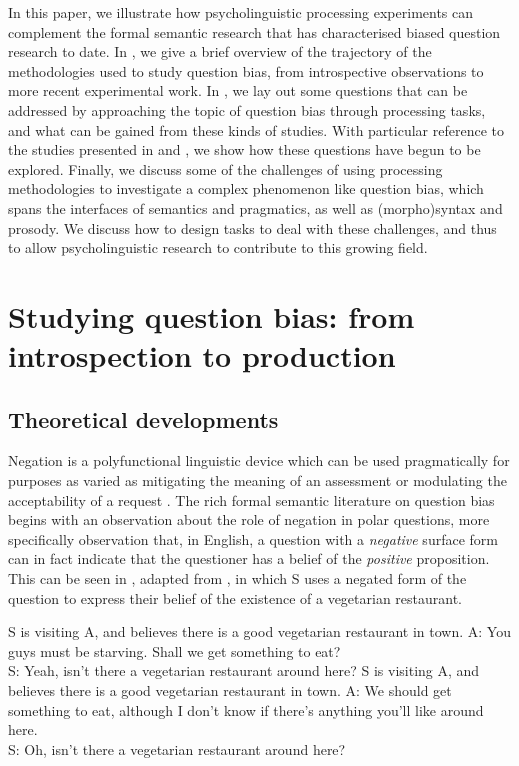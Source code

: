 \documentclass[output=paper,colorlinks,citecolor=brown]{langscibook}
\begin{document}
In this paper, we illustrate how psycholinguistic processing experiments can complement the formal semantic research that has characterised biased question research to date. In , we give a brief overview of the trajectory of the methodologies used to study question bias, from introspective observations to more recent experimental work. In , we lay out some questions that can be addressed by approaching the topic of question bias through processing tasks, and what can be gained from these kinds of studies. With particular reference to the studies presented in \citet{macuch_processing_inprep} and \citet{tian_representing_2021}, we show how these questions have begun to be explored. Finally, we discuss some of the challenges of using processing methodologies to investigate a complex phenomenon like question bias, which spans the interfaces of semantics and pragmatics, as well as (morpho)syntax and prosody. We discuss how to design tasks to deal with these challenges, and thus to allow psycholinguistic research to contribute to this growing field.

\section{Studying question bias: from introspection to production} \label{sec2}

\subsection{Theoretical developments}\label{sec2.1}

Negation is a polyfunctional linguistic device which can be used pragmatically for purposes as varied as mitigating the meaning of an assessment \citep[e.g.][]{fraenkel2008meaning, giora2005negation, krifka2007negated} or modulating the acceptability of a request \citep[e.g.][]{koike1994negation}. The rich formal semantic literature on question bias begins with an observation about the role of negation in polar questions, more specifically  observation that, in English, a question with a \textit{negative} surface form can in fact indicate that the questioner has a belief of the \textit{positive} proposition. This can be seen in , adapted from \citet{ladd_first_1981}, in which S uses a negated form of the question to express their belief of the existence of a vegetarian restaurant.

\begin{exe}
\ex \label{laddex} S is visiting A, and believes there is a good vegetarian restaurant in town.
\sn 
A: You guys must be starving. Shall we get something to eat?\\
S: Yeah, isn't there a vegetarian restaurant around here?
\ex \label{laddex2} S is visiting A, and believes there is a good vegetarian restaurant in town.
\sn 
A: We should get something to eat, although I don't know if there's anything you'll like around here.\\
S: Oh, isn't there a vegetarian restaurant around here?
\end{exe}
\end{document}
